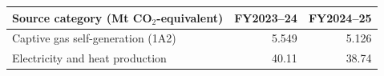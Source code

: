 \begin{tabular}{@{}p{.46\linewidth}rr@{}}\toprule
Source category (Mt CO$_2$-equivalent) & FY2023--24 & FY2024--25\\\midrule
Captive gas self-generation (1A2) & 5.549 & 5.126 \\
Electricity and heat production & 40.11 & 38.74 \\
\bottomrule\end{tabular}
